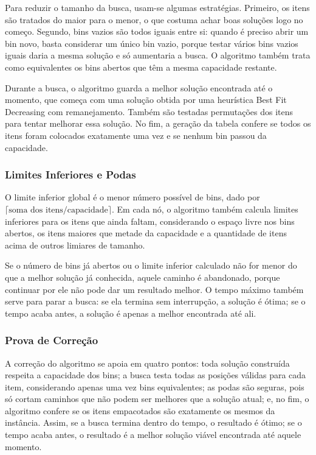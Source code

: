\documentclass[12pt]{article}
\begin{document}
Para reduzir o tamanho da busca, usam-se algumas estratégias. Primeiro, os itens são tratados do maior para o menor, o que costuma achar boas soluções logo no começo. Segundo, bins vazios são todos iguais entre si: quando é preciso abrir um bin novo, basta considerar um único bin vazio, porque testar vários bins vazios iguais daria a mesma solução e só aumentaria a busca. O algoritmo também trata como equivalentes os bins abertos que têm a mesma capacidade restante.

Durante a busca, o algoritmo guarda a melhor solução encontrada até o momento, que começa com uma solução obtida por uma heurística Best Fit Decreasing com remanejamento. Também são testadas permutações dos itens para tentar melhorar essa solução. No fim, a geração da tabela confere se todos os itens foram colocados exatamente uma vez e se nenhum bin passou da capacidade.

\subsubsection{Limites Inferiores e Podas}

O limite inferior global é o menor número possível de bins, dado por \(\lceil \text{soma dos itens} / \text{capacidade} \rceil\). Em cada nó, o algoritmo também calcula limites inferiores para os itens que ainda faltam, considerando o espaço livre nos bins abertos, os itens maiores que metade da capacidade e a quantidade de itens acima de outros limiares de tamanho.

Se o número de bins já abertos ou o limite inferior calculado não for menor do que a melhor solução já conhecida, aquele caminho é abandonado, porque continuar por ele não pode dar um resultado melhor. O tempo máximo também serve para parar a busca: se ela termina sem interrupção, a solução é ótima; se o tempo acaba antes, a solução é apenas a melhor encontrada até ali.

\subsubsection{Prova de Correção}

A correção do algoritmo se apoia em quatro pontos: toda solução construída respeita a capacidade dos bins; a busca testa todas as posições válidas para cada item, considerando apenas uma vez bins equivalentes; as podas são seguras, pois só cortam caminhos que não podem ser melhores que a solução atual; e, no fim, o algoritmo confere se os itens empacotados são exatamente os mesmos da instância. Assim, se a busca termina dentro do tempo, o resultado é ótimo; se o tempo acaba antes, o resultado é a melhor solução viável encontrada até aquele momento.
\end{document}

